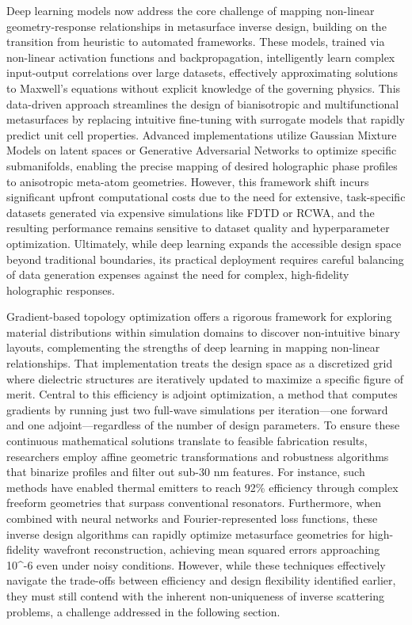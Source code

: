 Deep learning models now address the core challenge of mapping non-linear geometry-response relationships in metasurface inverse design, building on the transition from heuristic to automated frameworks. These models, trained via non-linear activation functions and backpropagation, intelligently learn complex input-output correlations over large datasets, effectively approximating solutions to Maxwell's equations without explicit knowledge of the governing physics. This data-driven approach streamlines the design of bianisotropic and multifunctional metasurfaces by replacing intuitive fine-tuning with surrogate models that rapidly predict unit cell properties. Advanced implementations utilize Gaussian Mixture Models on latent spaces or Generative Adversarial Networks to optimize specific submanifolds, enabling the precise mapping of desired holographic phase profiles to anisotropic meta-atom geometries. However, this framework shift incurs significant upfront computational costs due to the need for extensive, task-specific datasets generated via expensive simulations like FDTD or RCWA, and the resulting performance remains sensitive to dataset quality and hyperparameter optimization. Ultimately, while deep learning expands the accessible design space beyond traditional boundaries, its practical deployment requires careful balancing of data generation expenses against the need for complex, high-fidelity holographic responses. \citep{doi_10_1515_nanoph_2019_0474_d2187501} \citep{doi_10_48550_arxiv_2204_00433_1c5cfd3e} \citep{doi_10_3390_photonics12100947_b44bdefd}

Gradient-based topology optimization offers a rigorous framework for exploring material distributions within simulation domains to discover non-intuitive binary layouts, complementing the strengths of deep learning in mapping non-linear relationships. That implementation treats the design space as a discretized grid where dielectric structures are iteratively updated to maximize a specific figure of merit. Central to this efficiency is adjoint optimization, a method that computes gradients by running just two full-wave simulations per iteration---one forward and one adjoint---regardless of the number of design parameters. To ensure these continuous mathematical solutions translate to feasible fabrication results, researchers employ affine geometric transformations and robustness algorithms that binarize profiles and filter out sub-30 nm features. For instance, such methods have enabled thermal emitters to reach 92\% efficiency through complex freeform geometries that surpass conventional resonators. Furthermore, when combined with neural networks and Fourier-represented loss functions, these inverse design algorithms can rapidly optimize metasurface geometries for high-fidelity wavefront reconstruction, achieving mean squared errors approaching 10\^{}-6 even under noisy conditions. However, while these techniques effectively navigate the trade-offs between efficiency and design flexibility identified earlier, they must still contend with the inherent non-uniqueness of inverse scattering problems, a challenge addressed in the following section. \citep{doi_10_1002_adom_202500249_9967e710} \citep{doi_10_48550_arxiv_2603_15210_fdcfb92f} \citep{doi_10_1515_nanoph_2020_0579_8812c5b1}

